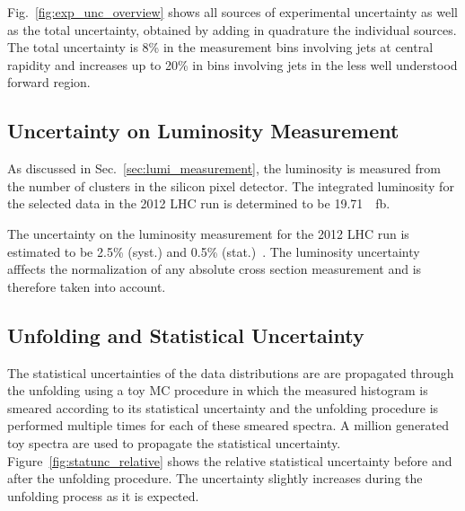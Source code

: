Fig.~\ref{fig:exp_unc_overview} shows all sources of experimental uncertainty as
well as the total uncertainty, obtained by adding in quadrature the individual
sources. The total uncertainty is 8\% in the measurement bins involving jets at
central rapidity and increases up to 20\% in bins involving jets in the less
well understood forward region.


\subsection {Uncertainty on Luminosity Measurement}

As discussed in Sec.~\ref{sec:lumi_measurement}, the luminosity is measured from
the number of clusters in the silicon pixel detector. The integrated luminosity
for the selected data in the 2012 LHC run is determined to be \SI{19.71}{\per
\femto \barn}. 

The uncertainty on the luminosity measurement for the 2012 LHC run is estimated
to be 2.5\% (syst.) and 0.5\% (stat.)~\cite{CMS-PAS-LUM-13-001}. The luminosity
uncertainty afffects the normalization of any absolute cross section measurement
and is therefore taken into account.

\subsection{Unfolding and Statistical Uncertainty}
\label{sec:stat_unf_uncert}

The statistical uncertainties of the data distributions are are propagated
through the unfolding using a toy MC procedure in which the measured histogram
is smeared according to its statistical uncertainty and the unfolding procedure
is performed multiple times for each of these smeared spectra. A million
generated toy spectra are used to propagate the statistical uncertainty.
Figure~\ref{fig:statunc_relative} shows the relative statistical uncertainty before and
after the unfolding procedure. The uncertainty slightly increases during the unfolding
process as it is expected.

